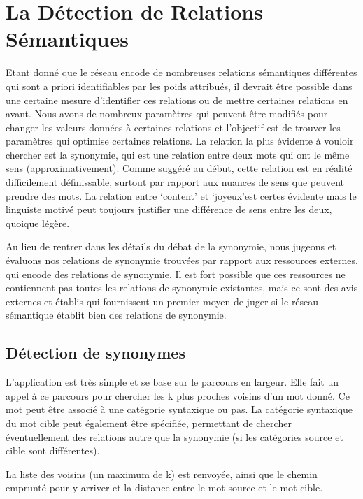 \section{La Détection de Relations Sémantiques}

Etant donné que le réseau encode de nombreuses relations sémantiques 
différentes qui sont a priori identifiables par les poids attribués, il devrait 
être possible dans une certaine mesure d'identifier ces relations ou de mettre 
certaines relations en avant. Nous avons de nombreux paramètres qui peuvent être 
modifiés pour changer les valeurs données à certaines relations et l'objectif 
est de trouver les paramètres qui optimise certaines relations. La relation la 
plus évidente à vouloir chercher est la synonymie, qui est une relation 
entre deux mots qui ont le même sens (approximativement). Comme suggéré au 
début, cette relation est en réalité difficilement définissable, surtout par 
rapport aux nuances de sens que peuvent prendre des mots. La relation entre 
\lq{content}\rq{} et \lq{joyeux}\rq est certes évidente mais le linguiste motivé 
peut toujours justifier une différence de sens entre les deux, quoique légère.

Au lieu de rentrer dans les détails du débat de la synonymie, nous jugeons et 
évaluons nos relations de synonymie trouvées par rapport aux ressources 
externes, qui encode des relations de synonymie. Il est fort possible que ces 
ressources ne contiennent pas toutes les relations de synonymie existantes, mais 
ce sont des avis externes et établis qui fournissent un premier moyen de juger 
si le réseau sémantique établit bien des relations de synonymie.

\subsection{Détection de synonymes}

L'application est très simple et se base sur le parcours en largeur. Elle fait 
un appel à ce parcours pour chercher les k plus 
proches voisins d'un mot donné. Ce mot peut être associé à une catégorie 
syntaxique ou pas. La catégorie syntaxique du mot cible peut également être 
spécifiée, permettant de chercher éventuellement des relations autre que la 
synonymie (si les catégories source et cible sont différentes).

La liste des voisins (un maximum de k) est renvoyée, ainsi que le chemin 
emprunté pour y arriver et la distance entre le mot source et le mot cible.

